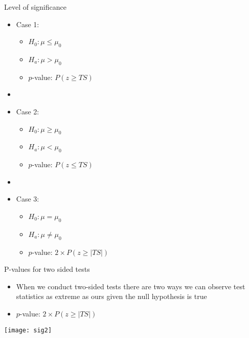 \documentclass[xcolor=dvipsnames]{beamer}
\begin{document}
\begin{frame}{Level of significance}
	\begin{itemize}
		\item Case 1:  \pause
		\begin{itemize}
			\item $H_0: \mu \leq \mu_0$  \pause
			\item $H_a: \mu > \mu_0$  \pause
			\item $p$-value: $P(z \geq TS)$  \pause
		\end{itemize}
		\item[]
		\item Case 2:
		\begin{itemize}
			\item $H_0: \mu \geq \mu_0$  \pause
			\item $H_a: \mu < \mu_0$  \pause
			\item $p$-value: $P(z \leq TS)$  \pause
		\end{itemize}
		\item[]
		\item Case 3:
		\begin{itemize}
			\item $H_0: \mu = \mu_0$ \pause
			\item $H_a: \mu \neq \mu_0$ \pause
			\item $p$-value: $2\times P(z \geq |TS|)$ 
		\end{itemize}
	\end{itemize}
\end{frame}

\begin{frame}{P-values for two sided tests}
\begin{itemize}
	\item When we conduct two-sided tests there are two ways we can observe test statistics as extreme as ours given the null hypothesis is true
	\item $p$-value: $2\times P(z \geq |TS|)$ 
\end{itemize}
\vspace{-5 pt}
\begin{center}
	\texttt{[image: sig2]}
\end{center}
\end{frame}
\end{document}

